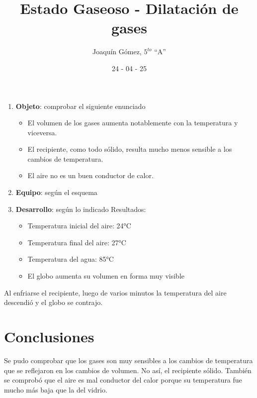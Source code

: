 \documentclass{article}
\title{Estado Gaseoso - Dilatación de gases}
\date{24 - 04 - 25}
\author{Joaquín Gómez, $5^{to}$ ``A''}
\begin{document}
\maketitle

\begin{enumerate}
    \item \textbf{Objeto}: comprobar el siguiente enunciado
          \begin{itemize}
              \item El volumen de los gases aumenta notablemente con la temperatura y viceversa.
              \item El recipiente, como todo sólido, resulta mucho menos sensible a los cambios de
                    temperatura.
              \item El aire no es un buen conductor de calor.
          \end{itemize}
    \item \textbf{Equipo}: según el esquema
    \item \textbf{Desarrollo}: según lo indicado
          Resultados:
          \begin{itemize}
            \item Temperatura inicial del aire: 24°C
            \item Temperatura final del aire: 27°C
            \item Temperatura del agua: 85°C
            \item El globo aumenta su volumen en forma muy visible
          \end{itemize}
\end{enumerate}

Al enfriarse el recipiente, luego de varios minutos la temperatura del aire
descendió y el globo se contrajo.

\section*{Conclusiones}
Se pudo comprobar que los gases son muy sensibles a los cambios de temperatura
que se reflejaron en los cambios de volumen. No así, el recipiente sólido.
También se comprobó que el aire es mal conductor del calor porque su
temperatura fue mucho más baja que la del vidrio.
\end{document}
